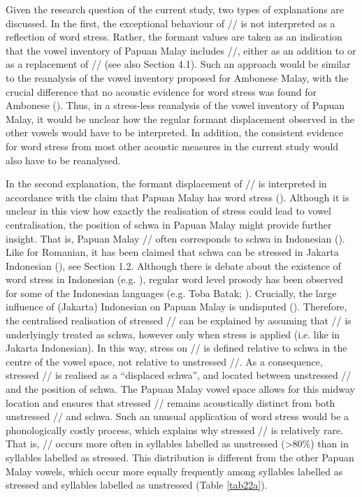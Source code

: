 Given the research question of the current study, two types of explanations are discussed. In the first, the exceptional behaviour of // is not interpreted as a reflection of word stress. Rather, the formant values are taken as an indication that the vowel inventory of Papuan Malay includes //, either as an addition to or as a replacement of // (see also Section 4.1). Such an approach would be similar to the reanalysis of the vowel inventory proposed for Ambonese Malay, with the crucial difference that no acoustic evidence for word stress was found for Ambonese (\citealt{maskikit-essed_no_2016}). Thus, in a stress-less reanalysis of the vowel inventory of Papuan Malay, it would be unclear how the regular formant displacement observed in the other vowels would have to be interpreted. In addition, the consistent evidence for word stress from most other acoustic measures in the current study would also have to be reanalysed.\par

In the second explanation, the formant displacement of // is interpreted in accordance with the claim that Papuan Malay has word stress (\citealt{kluge_grammar_2017}). Although it is unclear in this view how exactly the realisation of stress could lead to vowel centralisation, the position of schwa in Papuan Malay might provide further insight. That is, Papuan Malay // often corresponds to schwa in Indonesian (\citealt{donohue_papuan_2003}). Like for Romanian, it has been claimed that schwa can be stressed in Jakarta Indonesian (\citealt{laksman_location_1994}), see Section 1.2. Although there is debate about the existence of word stress in Indonesian (e.g. \citealt{goedemans_no_2014}), regular word level prosody has been observed for some of the Indonesian languages (e.g. Toba Batak; \citealt{goedemans_stress_2007}). Crucially, the large influence of (Jakarta) Indonesian on Papuan Malay is undisputed (\citealt{kluge_grammar_2017}). Therefore, the centralised realisation of stressed // can be explained by assuming that // is underlyingly treated as schwa, however only when stress is applied (i.e. like in Jakarta Indonesian). In this way, stress on // is defined relative to schwa in the centre of the vowel space, not relative to unstressed //. As a consequence, stressed // is realised as a ``displaced schwa'', and located between unstressed // and the position of schwa. The Papuan Malay vowel space allows for this midway location and ensures that stressed // remains acoustically distinct from both unstressed // and schwa. Such an unusual application of word stress would be a phonologically costly process, which explains why stressed // is relatively rare. That is, // occurs more often in syllables labelled as unstressed (>80\%) than in syllables labelled as stressed. This distribution is different from the other Papuan Malay vowels, which occur more equally frequently among syllables labelled as stressed and syllables labelled as unstressed (Table \ref{tab22a}).\par

